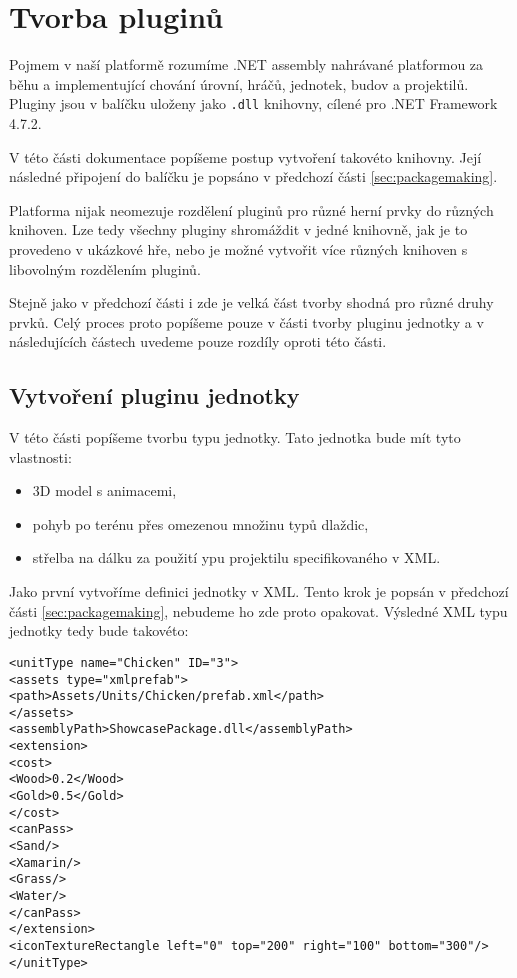 \chapter{Tvorba pluginů}
\label{sec:pluginmaking}
Pojmem  v naší platformě rozumíme .NET assembly nahrávané platformou za běhu a implementující chování úrovní, hráčů, jednotek, budov a projektilů. Pluginy jsou v balíčku uloženy jako \texttt{.dll} knihovny, cílené pro .NET Framework 4.7.2. 

V této části dokumentace popíšeme postup vytvoření takovéto knihovny. Její následné připojení do balíčku je popsáno v předchozí části \ref{sec:packagemaking}.

Platforma nijak neomezuje rozdělení pluginů pro různé herní prvky do různých knihoven. Lze tedy všechny pluginy shromáždit v jedné knihovně, jak je to provedeno v ukázkové hře, nebo je možné vytvořit více různých knihoven s libovolným rozdělením pluginů.

Stejně jako v předchozí části i zde je velká část tvorby shodná pro různé druhy prvků. Celý proces proto popíšeme pouze v části tvorby pluginu jednotky a v následujících částech uvedeme pouze rozdíly oproti této části.


\section{Vytvoření pluginu jednotky}
\label{sec:unittypeplugin}
V této části popíšeme tvorbu typu jednotky. Tato jednotka bude mít tyto vlastnosti:

\begin{itemize}
	\item 3D model s animacemi,
	\item pohyb po terénu přes omezenou množinu typů dlaždic,
	\item střelba na dálku za použití ypu projektilu specifikovaného v XML.
\end{itemize}

Jako první vytvoříme definici jednotky v XML. Tento krok je popsán v předchozí části \ref{sec:packagemaking}, nebudeme ho zde proto opakovat. Výsledné XML typu jednotky tedy bude takovéto:
\begin{lstlisting}
<unitType name="Chicken" ID="3">
<assets type="xmlprefab">
<path>Assets/Units/Chicken/prefab.xml</path>
</assets>
<assemblyPath>ShowcasePackage.dll</assemblyPath>
<extension>
<cost>
<Wood>0.2</Wood>
<Gold>0.5</Gold>
</cost>
<canPass>
<Sand/>
<Xamarin/>
<Grass/>
<Water/>
</canPass>
</extension>
<iconTextureRectangle left="0" top="200" right="100" bottom="300"/>
</unitType>
\end{lstlisting}

